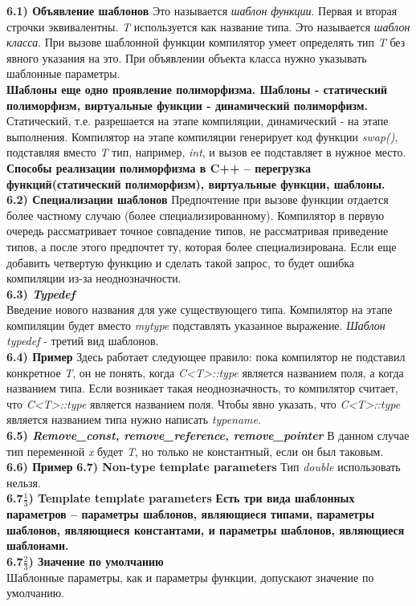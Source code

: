 \documentclass{article}
\begin{document}
\noindent \textbf{6.1) Объявление шаблонов}
Это называется \textit{шаблон функции}. Первая и вторая строчки эквивалентны. \textit{T} используется как название типа.
Это называется \textit{шаблон класса}.
При вызове шаблонной функции компилятор умеет определять тип \textit{T} без явного указания на это.
При объявлении объекта класса нужно указывать шаблонные параметры.\\
\textbf{Шаблоны еще одно проявление полиморфизма. Шаблоны -  статический полиморфизм, виртуальные функции - динамический полиморфизм.} Статический, т.е. разрешается на этапе компиляции, динамический - на этапе выполнения. Компилятор на этапе компиляции генерирует код функции \textit{swap()}, подставляя вместо \textit{T} тип, например, \textit{int}, и вызов ее подставляет в нужное место.\\
\textbf{Способы реализации полиморфизма в C++ -- перегрузка функций(статический полиморфизм), виртуальные функции, шаблоны.}\\
\noindent \textbf{6.2) Специализации шаблонов}
Предпочтение при вызове функции отдается более частному случаю (более специализированному). 
Компилятор в первую очередь рассматривает точное совпадение типов, не рассматривая приведение типов, а после этого предпочтет ту, которая более специализирована.
Если еще добавить четвертую функцию и сделать такой запрос, то будет ошибка компиляции из-за неоднозначности.\\
\noindent \textbf{6.3) \textit{Typedef}}\\
Введение нового названия для уже существующего типа.
Компилятор на этапе компиляции будет вместо \textit{mytype} подставлять указанное выражение.
\textit{Шаблон typedef} - третий вид шаблонов.\\
\noindent \textbf{6.4) Пример}
Здесь работает следующее правило: пока компилятор не подставил конкретное \textit{T}, он не понять, когда \textit{C<T>::type} является названием поля, а когда названием типа. Если возникает такая неоднозначность, то компилятор считает, что \textit{C<T>::type} является названием поля. Чтобы явно указать, что \textit{C<T>::type} является названием типа нужно написать \textit{typename}.\\
\noindent \textbf{6.5) \textit{Remove\_const, remove\_reference, remove\_pointer}}
В данном случае тип переменной \textit{x} будет \textit{T}, но только не константный, если он был таковым.\\
\noindent \textbf{6.6) Пример}
\noindent \textbf{6.7) Non-type template parameters}
Тип \textit{double} использовать нельзя.\\
\noindent \textbf{6.7$\frac{1}{3}$) Template template parameters}
\textbf{Есть три вида шаблонных параметров -- параметры шаблонов, являющиеся типами, параметры шаблонов, являющиеся константами, и параметры шаблонов, являющиеся шаблонами.}\\
\noindent \textbf{6.7$\frac{2}{3}$) Значение по умолчанию}\\
Шаблонные параметры, как и параметры функции, допускают значение по умолчанию.
\end{document}
